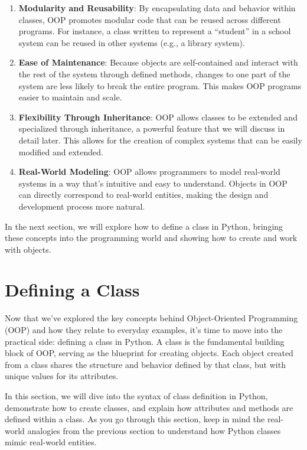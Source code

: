 \documentclass[
  letterpaper,
  DIV=11,
  numbers=noendperiod]{scrreprt}
\begin{document}
\begin{enumerate}
\def\labelenumi{\arabic{enumi}.}
\item
  \textbf{Modularity and Reusability}: By encapsulating data and
  behavior within classes, OOP promotes modular code that can be reused
  across different programs. For instance, a class written to represent
  a ``student'' in a school system can be reused in other systems (e.g.,
  a library system).
\item
  \textbf{Ease of Maintenance}: Because objects are self-contained and
  interact with the rest of the system through defined methods, changes
  to one part of the system are less likely to break the entire program.
  This makes OOP programs easier to maintain and scale.
\item
  \textbf{Flexibility Through Inheritance}: OOP allows classes to be
  extended and specialized through inheritance, a powerful feature that
  we will discuss in detail later. This allows for the creation of
  complex systems that can be easily modified and extended.
\item
  \textbf{Real-World Modeling}: OOP allows programmers to model
  real-world systems in a way that's intuitive and easy to understand.
  Objects in OOP can directly correspond to real-world entities, making
  the design and development process more natural.
\end{enumerate}

In the next section, we will explore how to define a class in Python,
bringing these concepts into the programming world and showing how to
create and work with objects.

\hypertarget{defining-a-class}{%
\section{Defining a Class}\label{defining-a-class}}

Now that we've explored the key concepts behind Object-Oriented
Programming (OOP) and how they relate to everyday examples, it's time to
move into the practical side: defining a class in Python. A class is the
fundamental building block of OOP, serving as the blueprint for creating
objects. Each object created from a class shares the structure and
behavior defined by that class, but with unique values for its
attributes.

In this section, we will dive into the syntax of class definition in
Python, demonstrate how to create classes, and explain how attributes
and methods are defined within a class. As you go through this section,
keep in mind the real-world analogies from the previous section to
understand how Python classes mimic real-world entities.
\end{document}

